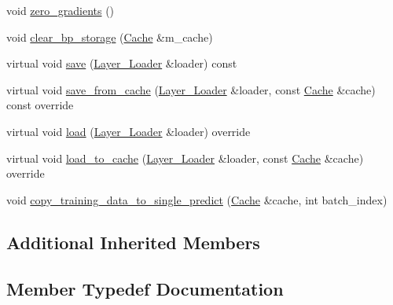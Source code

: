 \begin{DoxyCompactItemize}
\item 
void \hyperlink{structbc_1_1nn_1_1LSTM_ae8885e5fe317b5c485f64717e9037bb5}{zero\+\_\+gradients} ()
\item 
void \hyperlink{structbc_1_1nn_1_1LSTM_a0590ad585febcdcb70978238920881b2}{clear\+\_\+bp\+\_\+storage} (\hyperlink{structbc_1_1nn_1_1Cache}{Cache} \&m\+\_\+cache)
\item 
virtual void \hyperlink{structbc_1_1nn_1_1LSTM_ae74b5038cc10d0ad236be07704d2999a}{save} (\hyperlink{structbc_1_1nn_1_1Layer__Loader}{Layer\+\_\+\+Loader} \&loader) const
\item 
virtual void \hyperlink{structbc_1_1nn_1_1LSTM_a270951d7af7ffcf061d02bbb046a4dc7}{save\+\_\+from\+\_\+cache} (\hyperlink{structbc_1_1nn_1_1Layer__Loader}{Layer\+\_\+\+Loader} \&loader, const \hyperlink{structbc_1_1nn_1_1Cache}{Cache} \&cache) const override
\item 
virtual void \hyperlink{structbc_1_1nn_1_1LSTM_ae85ec6a90fe555a1088681159a0af466}{load} (\hyperlink{structbc_1_1nn_1_1Layer__Loader}{Layer\+\_\+\+Loader} \&loader) override
\item 
virtual void \hyperlink{structbc_1_1nn_1_1LSTM_a145581143a450d11a870b3c59cc1d47f}{load\+\_\+to\+\_\+cache} (\hyperlink{structbc_1_1nn_1_1Layer__Loader}{Layer\+\_\+\+Loader} \&loader, const \hyperlink{structbc_1_1nn_1_1Cache}{Cache} \&cache) override
\item 
void \hyperlink{structbc_1_1nn_1_1LSTM_a4ee041e97fa17ae5a17f143e4b28c077}{copy\+\_\+training\+\_\+data\+\_\+to\+\_\+single\+\_\+predict} (\hyperlink{structbc_1_1nn_1_1Cache}{Cache} \&cache, int batch\+\_\+index)
\end{DoxyCompactItemize}
\subsection*{Additional Inherited Members}


\subsection{Member Typedef Documentation}
\mbox{\label{structbc_1_1nn_1_1LSTM_a860169e34fe01e7c9faef6186353f856}} 
